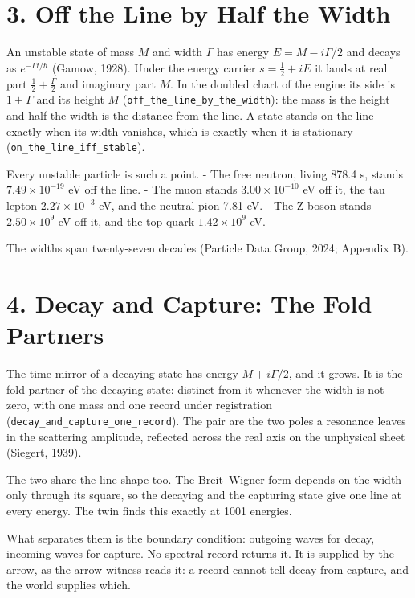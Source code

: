 \documentclass[10pt]{article}
\begin{document}
\endgroup

\hypertarget{off-the-line-by-half-the-width}{%
\section{3. Off the Line by Half the
Width}\label{off-the-line-by-half-the-width}}

An unstable state of mass \(M\) and width \(\Gamma\) has energy
\(E=M-i\Gamma/2\) and decays as \(e^{-\Gamma t/\hbar}\) (Gamow, 1928).
Under the energy carrier \(s=\tfrac12+iE\) it lands at real part
\(\tfrac12+\tfrac\Gamma2\) and imaginary part \(M\). In the doubled
chart of the engine its side is \(1+\Gamma\) and its height \(M\)
(\texttt{off\_the\_line\_by\_the\_width}): the mass is the height and
half the width is the distance from the line. A state stands on the line
exactly when its width vanishes, which is exactly when it is stationary
(\texttt{on\_the\_line\_iff\_stable}).

Every unstable particle is such a point. - The free neutron, living
878.4 s, stands \(7.49\times10^{-19}\) eV off the line. - The muon
stands \(3.00\times10^{-10}\) eV off it, the tau lepton
\(2.27\times10^{-3}\) eV, and the neutral pion 7.81 eV. - The Z boson
stands \(2.50\times10^{9}\) eV off it, and the top quark
\(1.42\times10^{9}\) eV.

The widths span twenty-seven decades (Particle Data Group, 2024;
Appendix B).

\hypertarget{decay-and-capture-the-fold-partners}{%
\section{4. Decay and Capture: The Fold
Partners}\label{decay-and-capture-the-fold-partners}}

The time mirror of a decaying state has energy \(M+i\Gamma/2\), and it
grows. It is the fold partner of the decaying state: distinct from it
whenever the width is not zero, with one mass and one record under
registration (\texttt{decay\_and\_capture\_one\_record}). The pair are
the two poles a resonance leaves in the scattering amplitude, reflected
across the real axis on the unphysical sheet (Siegert, 1939).

The two share the line shape too. The Breit--Wigner form depends on the
width only through its square, so the decaying and the capturing state
give one line at every energy. The twin finds this exactly at 1001
energies.

What separates them is the boundary condition: outgoing waves for decay,
incoming waves for capture. No spectral record returns it. It is
supplied by the arrow, as the arrow witness reads it: a record cannot
tell decay from capture, and the world supplies which.
\end{document}
